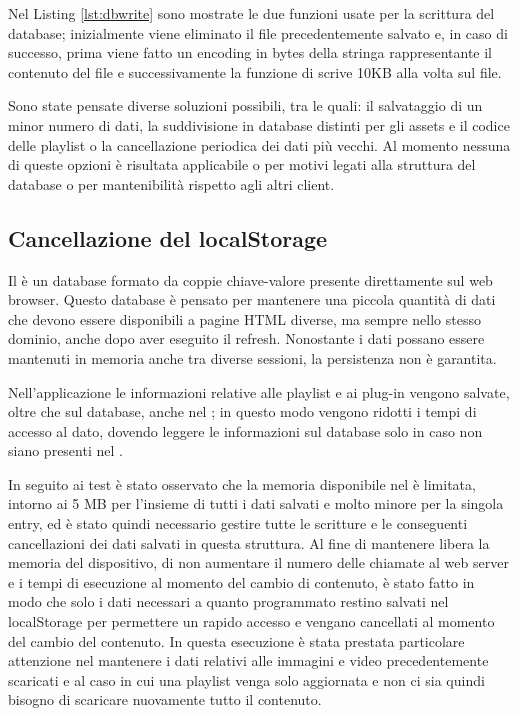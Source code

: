 Nel Listing \ref*{lst:dbwrite} sono mostrate le due funzioni usate per la scrittura del database; inizialmente viene eliminato il file precedentemente salvato e, in caso di successo, prima viene fatto un encoding in bytes della stringa rappresentante il contenuto del file e successivamente la funzione di  scrive 10KB alla volta sul file.

Sono state pensate diverse soluzioni possibili, tra le quali: il salvataggio di un minor numero di dati, la suddivisione in database distinti per gli assets e il codice delle playlist o la cancellazione periodica dei dati più vecchi. Al momento nessuna di queste opzioni è risultata applicabile o per motivi legati alla struttura del database o per mantenibilità rispetto agli altri client.

\subsection{Cancellazione del localStorage} \label{freestorage}

Il  è un database formato da coppie chiave-valore presente direttamente sul web browser. Questo database è pensato per mantenere una piccola quantità di dati che devono essere disponibili a pagine HTML diverse, ma sempre nello stesso dominio, anche dopo aver eseguito il refresh. Nonostante i dati possano essere mantenuti in memoria anche tra diverse sessioni, la persistenza non è garantita.  

Nell'applicazione le informazioni relative alle playlist e ai plug-in vengono salvate, oltre che sul database, anche nel ; in questo modo vengono ridotti i tempi di accesso al dato, dovendo leggere le informazioni sul database solo in caso non siano presenti nel .

In seguito ai test è stato osservato che la memoria disponibile nel  è limitata, intorno ai 5 MB per l'insieme di tutti i dati salvati e molto minore per la singola entry, ed è stato quindi necessario gestire tutte le scritture e le conseguenti cancellazioni dei dati salvati in questa struttura. Al fine di mantenere libera la memoria del dispositivo, di non aumentare il numero delle chiamate al web server e i tempi di esecuzione al momento del cambio di contenuto, è stato fatto in modo che solo i dati necessari a quanto programmato restino salvati nel localStorage per permettere un rapido accesso e vengano cancellati al momento del cambio del contenuto. In questa esecuzione è stata prestata particolare attenzione nel mantenere i dati relativi alle immagini e video precedentemente scaricati e al caso in cui una playlist venga solo aggiornata e non ci sia quindi bisogno di scaricare nuovamente tutto il contenuto.

